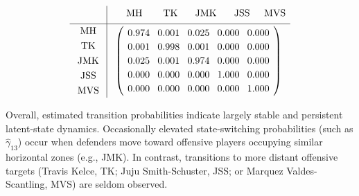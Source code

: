\documentclass[namedate,webpdf,modern,medium]{oup-authoring-template}
\providecommand{\DIFaddbegin}{} %
\providecommand{\DIFaddend}{} %
\providecommand{\DIFdelend}{} %
\begin{document}
\DIFdelend \DIFaddbegin $$
\renewcommand{\arraystretch}{1.2}
\setlength{\arraycolsep}{4pt}
\begin{array}{c|c}
    &
\hspace{-0.8em} %
    \begin{array}{ccccc}
        \ \ \ \ \ \ \text{MH} \ \ \ \ & \text{TK} \ \ \ & \text{JMK} \ \ \ & \text{JSS} \ \  & \text{MVS}\ \ 
    \end{array}
    \hspace{-1em} %
    \\[4pt] \hline
    \begin{array}{c}
        \text{MH} \\[1pt] 
        \text{TK} \\[1pt]
        \text{JMK} \\[1pt]
        \text{JSS} \\[1pt]
        \text{MVS} 
    \end{array}
    &
    \left(
      \begin{array}{ccccc}
      0.974 & 0.001 & 0.025 & 0.000 & 0.000 \\
      0.001 & 0.998 & 0.001 & 0.000 & 0.000 \\
      0.025 & 0.001 & 0.974 & 0.000 & 0.000 \\
      0.000 & 0.000 & 0.000 & 1.000 & 0.000 \\ 
      0.000 & 0.000 & 0.000 & 0.000 & 1.000
      \end{array}
    \right)
\end{array}
$$\DIFaddend 

Overall, estimated transition probabilities indicate largely stable and persistent latent-state dynamics. Occasionally elevated state-switching probabilities (such as $\hat{\gamma}_{13}$) occur when defenders move toward offensive players occupying similar horizontal zones (e.g., JMK). In contrast, transitions to more distant offensive targets (Travis Kelce, TK; Juju Smith-Schuster, JSS; or Marquez Valdes-Scantling, MVS) are seldom observed.
\end{document}
